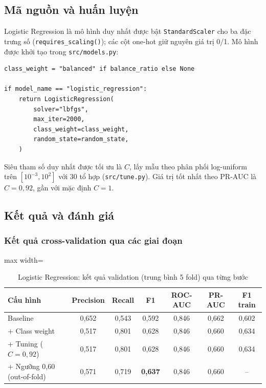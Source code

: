 \subsection{Mã nguồn và huấn luyện}
Logistic Regression là mô hình duy nhất được bật \texttt{StandardScaler} cho ba đặc trưng số (\texttt{requires\_scaling()}); các cột one-hot giữ nguyên giá trị 0/1. Mô hình được khởi tạo trong \texttt{src/models.py}:

\begin{lstlisting}[style=pythonstyle, caption={Khởi tạo Logistic Regression trong \texttt{src/models.py}}]
class_weight = "balanced" if balance_ratio else None

if model_name == "logistic_regression":
    return LogisticRegression(
        solver="lbfgs",
        max_iter=2000,
        class_weight=class_weight,
        random_state=random_state,
    )
\end{lstlisting}

Siêu tham số duy nhất được tối ưu là $C$, lấy mẫu theo phân phối log-uniform trên $[10^{-3}, 10^{2}]$ với 30 tổ hợp (\texttt{src/tune.py}). Giá trị tốt nhất theo PR-AUC là $C = 0{,}92$, gần với mặc định $C = 1$.

\subsection{Kết quả và đánh giá}

\subsubsection{Kết quả cross-validation qua các giai đoạn}
\begin{table}[H]
\centering
\small
\begin{adjustbox}{max width=\textwidth}
\begin{tabular}{|l|c|c|c|c|c|c|}
\hline
\textbf{Cấu hình} & \textbf{Precision} & \textbf{Recall} & \textbf{F1} & \textbf{ROC-AUC} & \textbf{PR-AUC} & \textbf{F1 train} \\
\hline
Baseline & 0,652 & 0,543 & 0,592 & 0,846 & 0,662 & 0,602 \\
\hline
+ Class weight & 0,517 & 0,801 & 0,628 & 0,846 & 0,660 & 0,634 \\
\hline
+ Tuning ($C = 0{,}92$) & 0,517 & 0,801 & 0,628 & 0,846 & 0,660 & 0,634 \\
\hline
+ Ngưỡng 0,60 (out-of-fold) & 0,571 & 0,719 & \textbf{0,637} & 0,846 & 0,660 & -- \\
\hline
\end{tabular}
\end{adjustbox}
\caption{Logistic Regression: kết quả validation (trung bình 5 fold) qua từng bước}
\end{table}

